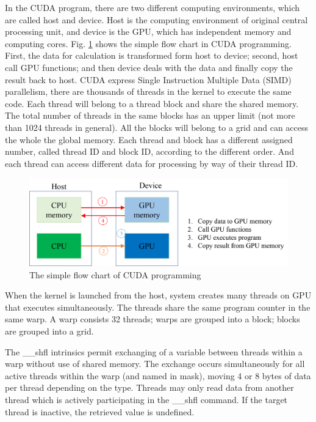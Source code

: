 In the CUDA program, there are two different computing environments, which are called host and device. Host is the computing environment of original central processing unit, and device is the GPU, which has independent memory and computing cores. Fig. \ref{fig:fig_2_4} shows the simple flow chart in CUDA programming. First, the data for calculation is transformed form host to device; second, host call GPU functions; and then device deals with the data and finally copy the result back to host. CUDA express Single Instruction Multiple Data (SIMD) parallelism, there are thousands of threads in the kernel to execute the same code. Each thread will belong to a thread block and share the shared memory. The total number of threads in the same blocks has an upper limit (not more than 1024 threads in general). All the blocks will belong to a grid and can access the whole the global memory. Each thread and block has a different assigned number, called thread ID and block ID, according to the different order. And each thread can access different data for processing by way of their thread ID.
\begin{figure}[h]
    \centering
    \includegraphics[scale=0.5]{image/fig_2_4}
    \caption{The simple flow chart of CUDA programming}
    \label{fig:fig_2_4}
\end{figure}

When the kernel is launched from the host, system creates many threads on GPU that executes simultaneously. The threads share the same program counter in the same warp. A warp consists 32 threads; warps are grouped into a block; blocks are grouped into a grid.

The \_\_shfl intrinsics permit exchanging of a variable between threads within a warp without use of shared memory. The exchange occurs simultaneously for all active threads within the warp (and named in mask), moving 4 or 8 bytes of data per thread depending on the type. Threads may only read data from another thread which is actively participating in the \_\_shfl command. If the target thread is inactive, the retrieved value is undefined.

